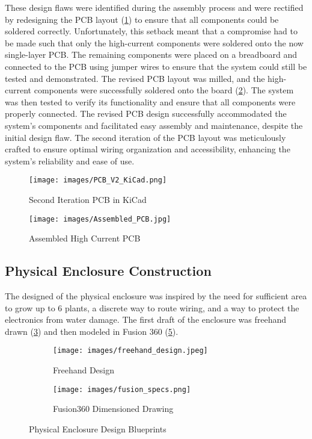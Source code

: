 \documentclass[12pt]{article} %
\begin{document}
\pagebreak
\noindent These design flaws were identified during the assembly process and were rectified by redesigning the PCB layout (\ref{fig:PCB_DESIGN_V2}) to ensure that all components could be soldered correctly. Unfortunately, this setback meant that a compromise had to be made such that only the high-current components were soldered onto the now single-layer PCB. The remaining components were placed on a breadboard and connected to the PCB using jumper wires to ensure that the system could still be tested and demonstrated. The revised PCB layout was milled, and the high-current components were successfully soldered onto the board (\ref{fig:Assembled_PCB}). The system was then tested to verify its functionality and ensure that all components were properly connected. The revised PCB design successfully accommodated the system's components and facilitated easy assembly and maintenance, despite the initial design flaw. The second iteration of the PCB layout was meticulously crafted to ensure optimal wiring organization and accessibility, enhancing the system's reliability and ease of use.
\begin{figure}[H]
    \centering
    \texttt{[image: images/PCB\_V2\_KiCad.png]}
    \caption{Second Iteration PCB in KiCad}
    \label{fig:PCB_DESIGN_V2}
\end{figure}

\begin{figure}[H]
    \centering
    \texttt{[image: images/Assembled\_PCB.jpg]}
    \caption{Assembled High Current PCB}
    \label{fig:Assembled_PCB}
\end{figure}

\pagebreak
\subsection{Physical Enclosure Construction}
\noindent The designed of the physical enclosure was inspired by the need for sufficient area to grow up to 6 plants, a discrete way to route wiring, and a way to protect the electronics from water damage. The first draft of the enclosure was freehand drawn (\ref{fig:freehand}) and then modeled in Fusion 360 (\ref{fig:blueprints}). 
\begin{figure}[H]
    \centering
    \begin{subfigure}[b]{0.5\textwidth}
        \centering
        \texttt{[image: images/freehand\_design.jpeg]}
        \caption{Freehand Design}
        \label{fig:freehand}
    \end{subfigure}
    \hfill
    \begin{subfigure}[b]{0.5\textwidth}
        \centering
        \texttt{[image: images/fusion\_specs.png]}
        \caption{Fusion360 Dimensioned Drawing}
        \label{fig:fusionSpecs}
    \end{subfigure}
    \caption{Physical Enclosure Design Blueprints}
    \label{fig:blueprints}
\end{figure}
\end{document}
